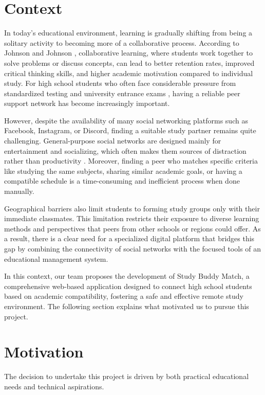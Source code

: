 \documentclass[a4paper,12pt]{report}
\begin{document}
\section{Context}

In today's educational environment, learning is gradually shifting from being a solitary activity to becoming more of a collaborative process. According to Johnson and Johnson \cite{johnson1999cooperative}, collaborative learning, where students work together to solve problems or discuss concepts, can lead to better retention rates, improved critical thinking skills, and higher academic motivation compared to individual study. For high school students who often face considerable pressure from standardized testing and university entrance exams \cite{ang2006academic}, having a reliable peer support network has become increasingly important.

However, despite the availability of many social networking platforms such as Facebook, Instagram, or Discord, finding a suitable study partner remains quite challenging. General-purpose social networks are designed mainly for entertainment and socializing, which often makes them sources of distraction rather than productivity \cite{kirschner2010facebook}. Moreover, finding a peer who matches specific criteria like studying the same subjects, sharing similar academic goals, or having a compatible schedule is a time-consuming and inefficient process when done manually.

Geographical barriers also limit students to forming study groups only with their immediate classmates. This limitation restricts their exposure to diverse learning methods and perspectives that peers from other schools or regions could offer. As a result, there is a clear need for a specialized digital platform that bridges this gap by combining the connectivity of social networks with the focused tools of an educational management system.

In this context, our team proposes the development of Study Buddy Match, a comprehensive web-based application designed to connect high school students based on academic compatibility, fostering a safe and effective remote study environment. The following section explains what motivated us to pursue this project.

\section{Motivation}

The decision to undertake this project is driven by both practical educational needs and technical aspirations.
\end{document}
